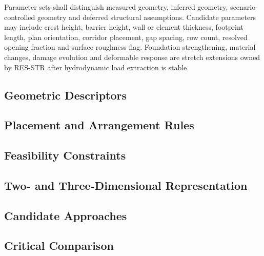 Parameter sets shall distinguish measured geometry, inferred geometry,
scenario-controlled geometry and deferred structural assumptions.
Candidate parameters may include crest height, barrier height, wall or
element thickness, footprint length, plan orientation, corridor
placement, gap spacing, row count, resolved opening fraction and
surface roughness flag. Foundation strengthening, material changes,
damage evolution and deformable response are stretch extensions owned
by RES-STR after hydrodynamic load extraction is stable.

\subsection{Geometric Descriptors}
\label{sec:res-geo-par-geometric-descriptors}


\subsection{Placement and Arrangement Rules}
\label{sec:res-geo-par-placement-arrangement-rules}


\subsection{Feasibility Constraints}
\label{sec:res-geo-par-feasibility-constraints}


\subsection{Two- and Three-Dimensional Representation}
\label{sec:res-geo-par-two-three-dimensional-representation}


\subsection{Candidate Approaches}
\label{sec:res-geo-par-candidate-approaches}


\subsection{Critical Comparison}
\label{sec:res-geo-par-critical-comparison}

